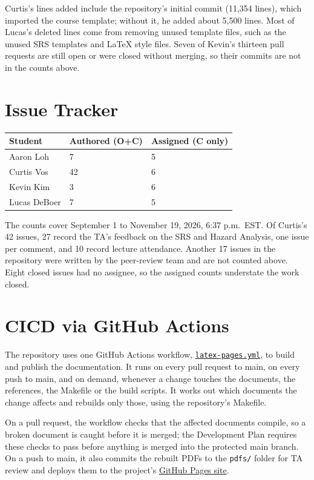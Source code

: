 \documentclass{article}
\begin{document}
Curtis's lines added include the repository's initial commit (11,354 lines),
which imported the course template; without it, he added about 5,500 lines.
Most of Lucas's deleted lines come from removing unused template files, such as
the unused SRS templates and LaTeX style files. Seven of Kevin's thirteen pull
requests are still open or were closed without merging, so their commits are not
in the counts above.

\section{Issue Tracker}

\begin{table}[H]
\centering
\begin{tabular}{lll}
\toprule
\textbf{Student} & \textbf{Authored (O+C)} & \textbf{Assigned (C only)}\\
\midrule
Aaron Loh & 7 & 5 \\
Curtis Vos & 42 & 6 \\
Kevin Kim & 3 & 6 \\
Lucas DeBoer & 7 & 5 \\
\bottomrule
\end{tabular}
\end{table}

The counts cover September 1 to November 19, 2026, 6:37 p.m.\ EST. Of Curtis's
42 issues, 27 record the TA's feedback on the SRS and Hazard Analysis, one issue
per comment, and 10 record lecture attendance. Another 17 issues in the
repository were written by the peer-review team and are not counted above. Eight
closed issues had no assignee, so the assigned counts understate the work closed.

\section{CICD via GitHub Actions}

The repository uses one GitHub Actions workflow,
\href{https://github.com/NaturalControl/natural-control/blob/main/.github/workflows/latex-pages.yml}{\texttt{latex-pages.yml}},
to build and publish the documentation. It runs on every pull request to main,
on every push to main, and on demand, whenever a change touches the documents,
the references, the Makefile or the build scripts. It works out which documents
the change affects and rebuilds only those, using the repository's Makefile.

On a pull request, the workflow checks that the affected documents compile, so a
broken document is caught before it is merged; the Development Plan requires
these checks to pass before anything is merged into the protected main branch.
On a push to main, it also commits the rebuilt PDFs to the \texttt{pdfs/} folder
for TA review and deploys them to the project's
\href{https://naturalcontrol.github.io/natural-control/}{GitHub Pages site}.
\end{document}
